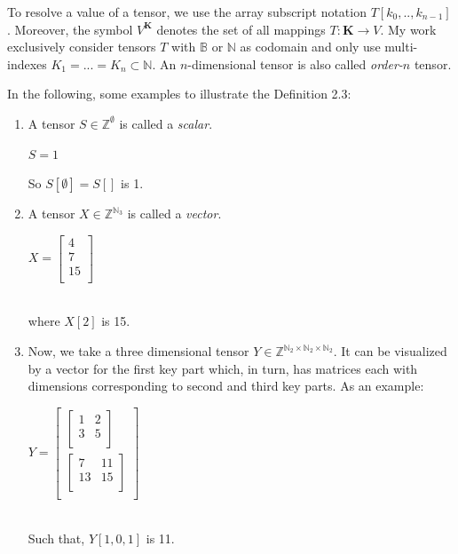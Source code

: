 To resolve a value of a tensor, we use the array subscript notation $T[k_0, .. , k_{n-1}]$. Moreover, the symbol $V^{\textbf{K}}$ denotes the set of all mappings $T: \textbf{K} \to V$. My work exclusively consider tensors $T$ with $\mathbb{B}$ or $\mathbb{N}$ as codomain and only use multi-indexes $K_1 = ... = K_n \subset \mathbb{N}$. An $n$-dimensional tensor is also called \textit{order-$n$} tensor.
\begin{example}
\label{tensors_examples}
 In the following, some examples to illustrate the Definition 2.3:

\begin{enumerate}
	\item A tensor $S \in \mathbb{Z}^{\emptyset}$ is called a \textit{scalar}.\\
	\centerline{$S = 1$}
	So $S[\emptyset] = S[]$ is 1.
	\item A tensor $X \in \mathbb{Z}^{\mathbb{N}_3}$ is called a \textit{vector}.\\
	\centerline{$X =\left[ \begin{array}{c}
		4 \\ 7 \\ 15\\
		\end{array}\right]$}\\
	where $X[2]$ is 15. 
	\item Now, we take a three dimensional tensor $Y \in \mathbb{Z}^{\mathbb{N}_2 \times \mathbb{N}_2 \times \mathbb{N}_2}$. It can be visualized by a vector for the first key part which, in turn, has matrices each with dimensions corresponding to second and third key parts. As an example:\\
	\centerline{$Y = \left[ 
		\begin{array}{c}
		\left[\begin{array}{cc}  1 & 2 \\ 3 & 5 \\\end{array} \right]\\ 
		\left[\begin{array}{cc} 7 & 11 \\ 13 & 15 \\\end{array} \right]\\ 
		\end{array}
		\right]$}\\
	Such that, $Y[1, 0, 1]$ is 11.
\end{enumerate}
\end{example}

